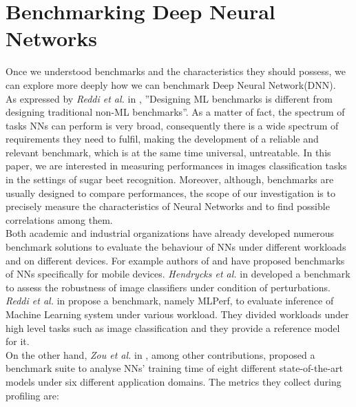 \section{Benchmarking Deep Neural Networks}\label{benchmarking_nn}
Once we understood benchmarks and the characteristics they should possess, we can explore more deeply how we can benchmark Deep Neural Network(DNN).\\
As expressed by \textit{Reddi et al. } in \cite{reddi2020mlperf}, ''Designing ML benchmarks is different from designing traditional non-ML benchmarks''. As a matter of fact, the spectrum of tasks NNs can perform is very broad, consequently there is a wide spectrum of requirements they need to fulfil, making the development of a reliable and relevant benchmark, which is at the same time universal, untreatable. In this paper, we are interested in measuring performances in images classification tasks in the settings of sugar beet recognition. Moreover, although, benchmarks are usually designed to compare performances, the scope of our investigation is to precisely measure the characteristics of Neural Networks and to find possible correlations among them. \\
Both academic and industrial organizations have already developed numerous benchmark solutions to evaluate the behaviour of NNs under different workloads and on different devices. For example authors of \cite{luo2020comparison} and \cite{ignatov2019ai} have proposed benchmarks of NNs specifically for mobile devices. \textit{Hendrycks et al.} in  \cite{hendrycks2019benchmarking} developed a benchmark to assess the robustness of image classifiers under condition of perturbations. \\
\textit{Reddi et al.} in  \cite{reddi2020mlperf}propose a benchmark, namely MLPerf, to evaluate inference of Machine Learning system under various workload. They divided workloads under high level tasks such as image classification and they provide a reference model for it. \\
On the other hand, \textit{Zou et al. } in \cite{8573476}, among other contributions, proposed a benchmark suite to analyse NNs' training time of eight different state-of-the-art models under six different application domains. The metrics they collect during profiling are:

